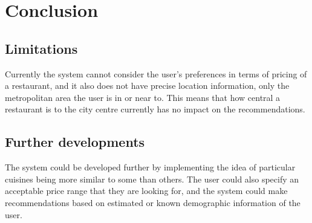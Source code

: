 \documentclass[conference]{IEEEtran}
\begin{document}
\section{Conclusion}

\subsection{Limitations}
Currently the system cannot consider the user's preferences in terms of pricing of a restaurant, and it also does 
not have precise location information, only the metropolitan area the user is in or near to. 
This means that how central a restaurant is to the city centre currently has no impact on the recommendations. 

\subsection{Further developments}
The system could be developed further by implementing the idea of particular cuisines being more similar 
to some than others. 
The user could also specify an acceptable price range that they are looking for, and the system could make 
recommendations based on estimated or known demographic information of the user. 




\end{document}
